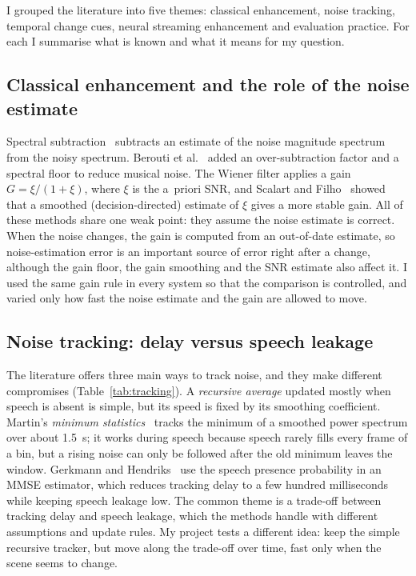 \documentclass[10pt,conference,a4paper]{IEEEtran}
\begin{document}
I grouped the literature into five themes: classical enhancement, noise
tracking, temporal change cues, neural streaming enhancement and evaluation
practice. For each I summarise what is known and what it means for my question.

\subsection{Classical enhancement and the role of the noise estimate}
Spectral subtraction~\cite{boll1979spectral} subtracts an estimate of the noise
magnitude spectrum from the noisy spectrum. Berouti et
al.~\cite{berouti1979enhancement} added an over-subtraction factor and a
spectral floor to reduce musical noise. The Wiener filter applies a gain
$G=\xi/(1+\xi)$, where $\xi$ is the a~priori SNR, and Scalart and
Filho~\cite{scalart1996apriori} showed that a smoothed (decision-directed)
estimate of $\xi$ gives a more stable gain. All of these methods share one
weak point: they assume the noise estimate is correct. When the noise changes,
the gain is computed from an out-of-date estimate, so noise-estimation error is
an important source of error right after a change, although the gain floor, the
gain smoothing and the SNR estimate also affect it. I used the same gain rule in
every system so that the comparison is controlled, and varied only how fast the
noise estimate and the gain are allowed to move.

\subsection{Noise tracking: delay versus speech leakage}
The literature offers three main ways to track noise, and they make different
compromises (Table~\ref{tab:tracking}). A \emph{recursive average} updated
mostly when speech is absent is simple, but its speed is fixed by its smoothing
coefficient. Martin's \emph{minimum statistics}~\cite{martin2001noise} tracks
the minimum of a smoothed power spectrum over about 1.5~s; it works during
speech because speech rarely fills every frame of a bin, but a rising noise can
only be followed after the old minimum leaves the window. Gerkmann and
Hendriks~\cite{gerkmann2012unbiased} use the speech presence probability in an
MMSE estimator, which reduces tracking delay to a few hundred milliseconds while
keeping speech leakage low. The common theme is a trade-off between tracking
delay and speech leakage, which the methods handle with different assumptions
and update rules. My
project tests a different idea: keep the simple recursive tracker, but move
along the trade-off over time, fast only when the scene seems to change.
\end{document}
